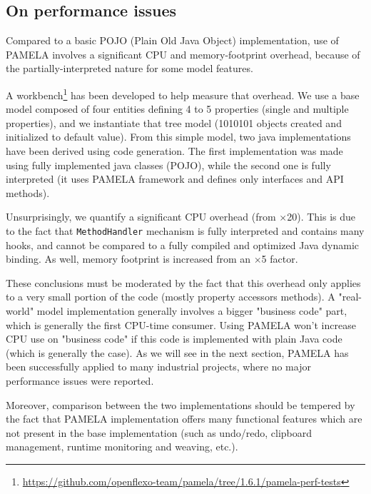 \subsection{On performance issues}

Compared to a basic POJO (Plain Old Java Object) implementation, use of PAMELA involves a significant CPU and memory-footprint overhead, because of the partially-interpreted nature for some model features.

A workbench\footnote {\url{https://github.com/openflexo-team/pamela/tree/1.6.1/pamela-perf-tests}} has been developed to help measure that overhead. We use a base model composed of four entities defining 4 to 5 properties (single and multiple properties), and we instantiate that tree model (1010101 objects created and initialized to default value). From this simple model, two java implementations have been derived using code generation. The first implementation was made using fully implemented java classes (POJO), while the second one is fully interpreted (it uses PAMELA framework and defines only interfaces and API methods). 

Unsurprisingly, we quantify a significant CPU overhead (from $\times$20). This is due to the fact that \texttt{MethodHandler} mechanism is fully interpreted and contains many hooks, and cannot be compared to a fully compiled and optimized Java dynamic binding. As well, memory footprint is increased from an 
$\times$5 factor.

These conclusions must be moderated by the fact that this overhead only applies
to a very small portion of the code (mostly property accessors methods). A "real-world" model implementation generally involves a bigger "business code" part, which is generally the first CPU-time consumer. Using PAMELA won’t increase CPU use on "business code" if this code is implemented with plain Java code (which is generally the case). As we will see in the next section, PAMELA has been successfully applied to many industrial projects, where no major performance issues were reported.

Moreover, comparison between the two implementations should be tempered by the fact that PAMELA implementation offers many functional features which are not present in the base implementation (such as undo/redo, clipboard management, runtime monitoring and weaving, etc.).


